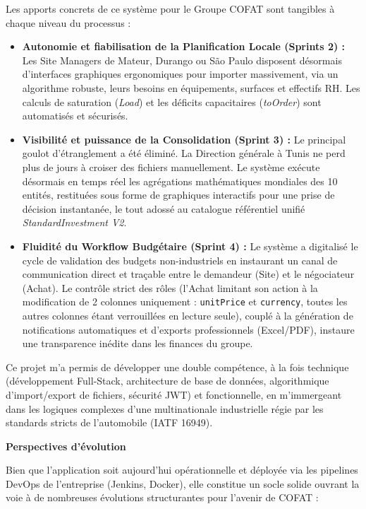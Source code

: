 Les apports concrets de ce système pour le Groupe COFAT sont tangibles à chaque niveau du processus :
\begin{itemize}
    \item \textbf{Autonomie et fiabilisation de la Planification Locale (Sprints 2) :} Les Site Managers de Mateur, Durango ou São Paulo disposent désormais d'interfaces graphiques ergonomiques pour importer massivement, via un algorithme robuste, leurs besoins en équipements, surfaces et effectifs RH. Les calculs de saturation (\textit{Load}) et les déficits capacitaires (\textit{toOrder}) sont automatisés et sécurisés.
    \item \textbf{Visibilité et puissance de la Consolidation (Sprint 3) :} Le principal goulot d'étranglement a été éliminé. La Direction générale à Tunis ne perd plus de jours à croiser des fichiers manuellement. Le système exécute désormais en temps réel les agrégations mathématiques mondiales des 10 entités, restituées sous forme de graphiques interactifs pour une prise de décision instantanée, le tout adossé au catalogue référentiel unifié \textit{StandardInvestment V2}.
    \item \textbf{Fluidité du Workflow Budgétaire (Sprint 4) :} Le système a digitalisé le cycle de validation des budgets non-industriels en instaurant un canal de communication direct et traçable entre le demandeur (Site) et le négociateur (Achat). Le contrôle strict des rôles (l'Achat limitant son action à la modification de 2 colonnes uniquement : \texttt{unitPrice} et \texttt{currency}, toutes les autres colonnes étant verrouillées en lecture seule), couplé à la génération de notifications automatiques et d'exports professionnels (Excel/PDF), instaure une transparence inédite dans les finances du groupe.
\end{itemize}

Ce projet m'a permis de développer une double compétence, à la fois technique (développement Full-Stack, architecture de base de données, algorithmique d'import/export de fichiers, sécurité JWT) et fonctionnelle, en m'immergeant dans les logiques complexes d'une multinationale industrielle régie par les standards stricts de l'automobile (IATF 16949).

\textbf{Perspectives d'évolution}

Bien que l'application soit aujourd'hui opérationnelle et déployée via les pipelines DevOps de l'entreprise (Jenkins, Docker), elle constitue un socle solide ouvrant la voie à de nombreuses évolutions structurantes pour l'avenir de COFAT :

